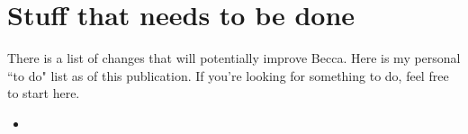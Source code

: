 \chapter{Stuff that needs to be done}

There is a list of changes that will potentially improve Becca.  Here is my personal ``to do" list as of this publication. If you're looking for something to do, feel free to start here.

\begin{itemize}
\item 

\end{itemize}